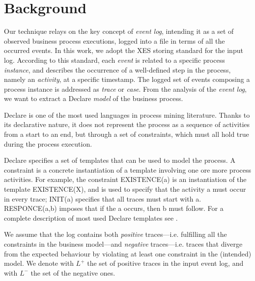 \section{Background}%
\label{sec:back}

Our technique relays on the key concept of \emph{event log}, intending it as a set of observed business process executions, logged into a file in terms of all the occurred events. In this work, we adopt the \ac{XES} storing standard \cite{XES} for the input log. According to this standard, each \emph{event} is related to a specific process \emph{instance}, and describes the occurrence of a well-defined step in the process, namely an \emph{activity}, at a specific timestamp. The logged set of events composing a process instance is addressed as \emph{trace} or \emph{case}. 
From the analysis of the \emph{event log}, we want to extract a Declare \cite{2008-Pesic,2009-Aalst} \emph{model} %
of the business process. %

Declare is one of the most used languages in process mining literature. Thanks to its declarative nature, it does not represent the process as a sequence of activities from a start to an end, but through a set of constraints, which must all hold true during the process execution.

Declare specifies a set of templates that can be used to model the process. 
A constraint is a concrete instantiation of a template involving one ore more process activities.
For example, the constraint \textsf{EXISTENCE(a)} is an instantiation of the template \textsf{EXISTENCE(X)}, and is used to specify that the activity \textsf{a} must occur in every trace; \textsf{INIT(a)} specifies that all traces must start with \textsf{a}. \textsf{RESPONCE(a,b)} imposes that if the \textsf{a} occurs, then \textsf{b} must follow.
For a complete description of most used Declare templates see \cite{2008-Pesic}. 

We assume that the log contains both \emph{positive} traces---i.e. fulfilling all the constraints in the business model---and \emph{negative} traces---i.e. traces that diverge from the expected behaviour by violating at least one constraint in the (intended) model. 
We denote with $L^+$ the set of positive traces in the input event log, and with $L^-$ the set of the negative ones.


